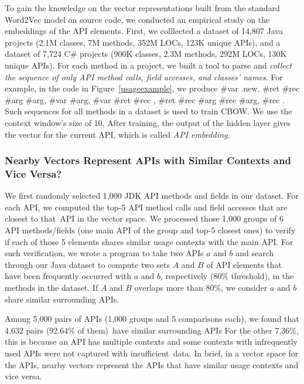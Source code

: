 To gain the knowledge on the vector representations built from the
standard Word2Vec model on source code, we conducted an empirical
study on the embeddings of the API elements. First, we colllected a
dataset of 14,807 Java projects (2.1M classes, 7M methods, 352M LOCs,
123K unique APIs), and a dataset of 7,724 C\# projects (900K classes,
2.3M methods, 292M LOCs, 130K unique APIs). For each method in a
project, we built a tool to parse and {\em collect the sequence of
  only API method calls, field accesses, and classes' names}.
For example, in the code in Figure~\ref{usageexample}, we produce
\#var .new,  
%
\#ret \#rec  \#arg \#arg, 
%
\#var  \#arg,
%
 \#var \#ret \#rec ,
%
\#ret \#rec  \#arg \#rec  \#arg,
%
\#rec . Such sequences for all
methods in a dataset is used to train CBOW. We use the context
window's size of 10. After training, the output of the hidden layer
gives the vector for the current API, which is called {\em API
  embedding}.

\subsubsection*{Nearby Vectors Represent APIs with Similar Contexts and Vice Versa?}

We first randomly selected 1,000 JDK API methods and fields in our
dataset. For each API, we computed the top-5 API method calls and
field accesses that are closest to that~API in the vector space.  We
processed those 1,000 groups of 6 API methods/fields (one main API of
the group and top-5 closest ones) to verify if each of those 5
elements shares similar usage contexts with the main API. For such
verification, we wrote a program to take two APIs $a$ and $b$ and
search through our Java dataset to compute two sets $A$ and $B$ of API
elements that have been frequently occurred with $a$ and $b$,
respectively (80\% threshold), in the methods in the dataset. If $A$
and $B$ overlaps more than 80\%, we consider $a$ and $b$ share similar
surrounding APIs.

Among 5,000 pairs of APIs (1,000 groups and 5 comparisons each), we
found that 4,632 pairs (92.64\% of them)~have similar surrounding APIs
For the other 7.36\%, this is because an API has multiple contexts and
some contexts with infrequently used APIs were not captured with
insufficient~data. In brief, in a vector space for the APIs,
nearby vectors represent the APIs that have similar usage contexts and
vice versa.

